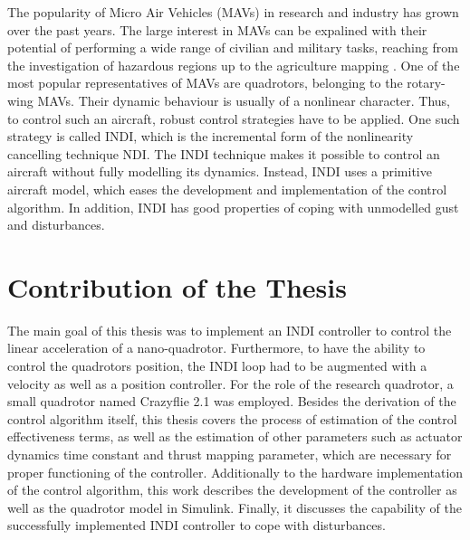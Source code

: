 \documentclass[11pt, a4paper, twoside]{report}
\begin{document}
The popularity of Micro Air Vehicles (MAVs) in research and industry has grown over the past years. The large interest in \acrshort{MAV}s can be expalined with their potential of performing a wide range of civilian and military tasks, reaching from the investigation of hazardous regions up to the agriculture mapping \cite{Ward}. One of the most popular representatives of \acrshort{MAV}s are quadrotors, belonging to the rotary-wing \acrshort{MAV}s. Their dynamic behaviour is usually of a nonlinear character. Thus, to control such an aircraft, robust control strategies have to be applied. One such strategy is called \acrfull{INDI}, which is the incremental form of the nonlinearity cancelling technique \acrfull{NDI}. The \acrshort{INDI} technique makes it possible to control an aircraft without fully modelling its dynamics. Instead, \acrshort{INDI} uses a primitive aircraft model, which eases the development and implementation of the control algorithm. In addition, \acrshort{INDI} has good properties of coping with unmodelled gust and disturbances. 

\section{Contribution of the Thesis} \label{sec:contribution_ofthe_thesis}

The main goal of this thesis was to implement an \acrshort{INDI} controller to control the linear acceleration of a nano-quadrotor. Furthermore, to have the ability to control the quadrotors position, the \acrshort{INDI} loop had to be augmented with a velocity as well as a position controller. For the role of the research quadrotor, a small quadrotor named Crazyflie 2.1 was employed. Besides the derivation of the control algorithm itself, this thesis covers the process of estimation of the control effectiveness terms, as well as the estimation of other parameters such as actuator dynamics time constant and thrust mapping parameter, which are necessary for proper functioning of the controller. Additionally to the hardware implementation of the control algorithm, this work describes the development of the controller as well as the quadrotor model in Simulink. Finally, it discusses the capability of the successfully implemented \acrshort{INDI} controller to cope with disturbances. 

\end{document}
